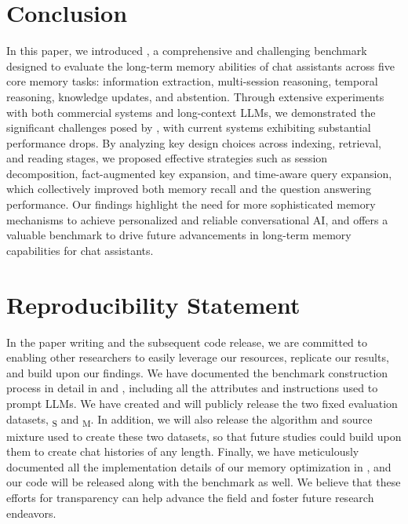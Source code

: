 \section{Conclusion}

In this paper, we introduced \BENCHMARK{}, a comprehensive and challenging benchmark designed to evaluate the long-term memory abilities of chat assistants across five core memory tasks: information extraction, multi-session reasoning, temporal reasoning, knowledge updates, and abstention. Through extensive experiments with both commercial systems and long-context LLMs, we demonstrated the significant challenges posed by \BENCHMARK{}, with current systems exhibiting substantial performance drops. By analyzing key design choices across indexing, retrieval, and reading stages, we proposed effective strategies such as session decomposition, fact-augmented key expansion, and time-aware query expansion, which collectively improved both memory recall and the question answering performance. Our findings highlight the need for more sophisticated memory mechanisms to achieve personalized and reliable conversational AI, and \BENCHMARK{} offers a valuable benchmark to drive future advancements in long-term memory capabilities for chat assistants.


\section*{Reproducibility Statement}

In the paper writing and the subsequent code release, we are committed to enabling other researchers to easily leverage our resources, replicate our results, and build upon our findings. 
We have documented the benchmark construction process in detail in  and , including all the attributes and instructions used to prompt LLMs. We have created and will publicly release the two fixed evaluation datasets, \BENCHMARK\textsubscript{\textsc{S}} and \BENCHMARK\textsubscript{\textsc{M}}. In addition, we will also release the algorithm and source mixture used to create these two datasets, so that future studies could build upon them to create chat histories of any length. Finally, we have meticulously documented all the implementation details of our memory optimization in , and our code will be released along with the benchmark as well. We believe that these efforts for transparency can help advance the field and foster future research endeavors.

